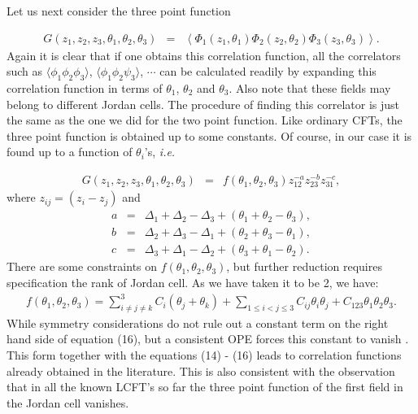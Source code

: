 \documentclass[a4paper,11pt]{article}
\begin{document}
Let us next consider the three point function

\begin{eqnarray}
G(z_{1},z_{2},z_{3},\theta_{1},\theta_{2},\theta_{3})&=&\left<
\Phi_{1}(z_{1},\theta_{1})\Phi_{2}(z_{2},\theta_{2})
\Phi_{3}(z_{3},\theta_{3})\right>.
\end{eqnarray}
Again it is clear that if one obtains this correlation function,
all the correlators such as
$\langle\phi_{1}\phi_{2}\phi_{3}\rangle$,
$\langle\phi_{1}\phi_{2}\psi_{3}\rangle$, $\cdots$ can be
calculated readily by expanding this correlation function in
terms of $\theta_{1}$, $\theta_{2}$ and $\theta_{3}$. Also note
that these fields may belong to different Jordan cells. The
procedure of finding this correlator is just the same as the one
we did for the two point function. Like ordinary CFTs, the three
point function is obtained up to some constants. Of course, in
our case it is found up to a function of $\theta_{i}$'s, {\it
i.e.}

\begin{eqnarray}
G(z_{1},z_{2},z_{3},\theta_{1},\theta_{2},\theta_{3})&=&
f(\theta_{1},\theta_{2},\theta_{3})z_{12}^{-a}z_{23}^{-b}z_{31}^{-c},
\end{eqnarray}
where $z_{ij}=(z_{i}-z_{j})$ and
\begin{eqnarray}
a&=&\Delta_{1}+\Delta_{2}-\Delta_{3}+(\theta_{1}+\theta_{2}-\theta_{3}) ,\nonumber\\
b&=&\Delta_{2}+\Delta_{3}-\Delta_{1}+(\theta_{2}+\theta_{3}-\theta_{1}) ,\nonumber\\
c&=&\Delta_{3}+\Delta_{1}-\Delta_{2}+(\theta_{3}+\theta_{1}-\theta_{2})
.
\end{eqnarray}
There are some constraints on
$f(\theta_{1},\theta_{2},\theta_{3})$, but further reduction
requires specification the rank of Jordan cell. As we have taken
it to be 2, we have:
\begin{eqnarray}
f(\theta_{1},\theta_{2},\theta_{3})=\sum_{i\neq j\neq
k}^{3}C_{i}(\theta_{j}+\theta_{k}) +\sum_{1\leq
i<j\leq3}C_{ij}\theta_{i}\theta_{j}
+C_{123}\theta_{1}\theta_{2}\theta_{3} .
\end{eqnarray}
While symmetry considerations do not rule out a constant term on
the right hand side of equation (16), but a consistent OPE forces
this constant to vanish \cite{MRS}. This form together with the
equations (14) - (16) leads to correlation functions already
obtained in the literature. This is also consistent with the
observation that in all the known LCFT's so far the three point
function of the first field in the Jordan cell vanishes.
\end{document}
